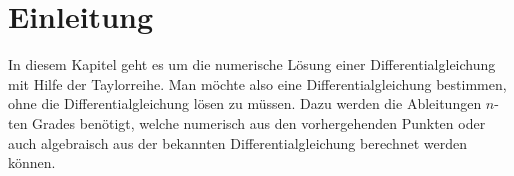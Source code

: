 %
%
%
\section{Einleitung
\label{taylor:section:einleitung}}
In diesem Kapitel geht es um die numerische Lösung einer Differentialgleichung mit Hilfe der Taylorreihe.
Man möchte also eine Differentialgleichung bestimmen, ohne die Differentialgleichung lösen zu müssen.
Dazu werden die Ableitungen $n$-ten Grades benötigt, welche numerisch aus den vorhergehenden Punkten oder auch algebraisch aus der bekannten Differentialgleichung berechnet werden können.

